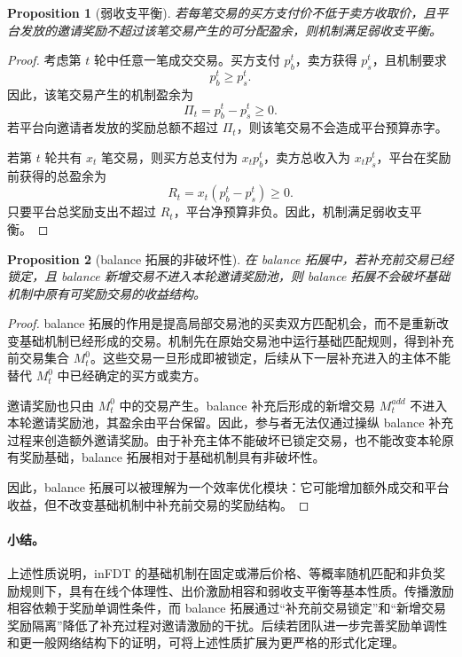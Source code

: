 \documentclass[UTF8,a4paper,12pt]{ctexart}
\newtheorem{proposition}{Proposition}
\begin{document}
\begin{proposition}[弱收支平衡]
    若每笔交易的买方支付价不低于卖方收取价，且平台发放的邀请奖励不超过该笔交易产生的可分配盈余，则机制满足弱收支平衡。
\end{proposition}

\begin{proof}
    考虑第 \(t\) 轮中任意一笔成交交易。买方支付 \(p_b^t\)，卖方获得 \(p_s^t\)，且机制要求
    \[
        p_b^t\ge p_s^t.
    \]
    因此，该笔交易产生的机制盈余为
    \[
        \Pi_t=p_b^t-p_s^t\ge 0.
    \]
    若平台向邀请者发放的奖励总额不超过 \(\Pi_t\)，则该笔交易不会造成平台预算赤字。

    若第 \(t\) 轮共有 \(x_t\) 笔交易，则买方总支付为 \(x_t p_b^t\)，卖方总收入为 \(x_t p_s^t\)，平台在奖励前获得的总盈余为
    \[
        R_t=x_t(p_b^t-p_s^t)\ge 0.
    \]
    只要平台总奖励支出不超过 \(R_t\)，平台净预算非负。因此，机制满足弱收支平衡。
\end{proof}

\begin{proposition}[balance 拓展的非破坏性]
    在 balance 拓展中，若补充前交易已经锁定，且 balance 新增交易不进入本轮邀请奖励池，则 balance 拓展不会破坏基础机制中原有可奖励交易的收益结构。
\end{proposition}

\begin{proof}
    balance 拓展的作用是提高局部交易池的买卖双方匹配机会，而不是重新改变基础机制已经形成的交易。机制先在原始交易池中运行基础匹配规则，得到补充前交易集合 \(M_t^0\)。这些交易一旦形成即被锁定，后续从下一层补充进入的主体不能替代 \(M_t^0\) 中已经确定的买方或卖方。

    邀请奖励也只由 \(M_t^0\) 中的交易产生。balance 补充后形成的新增交易 \(M_t^{add}\) 不进入本轮邀请奖励池，其盈余由平台保留。因此，参与者无法仅通过操纵 balance 补充过程来创造额外邀请奖励。由于补充主体不能破坏已锁定交易，也不能改变本轮原有奖励基础，balance 拓展相对于基础机制具有非破坏性。

    因此，balance 拓展可以被理解为一个效率优化模块：它可能增加额外成交和平台收益，但不改变基础机制中补充前交易的奖励结构。
\end{proof}

\paragraph{小结。}
上述性质说明，inFDT 的基础机制在固定或滞后价格、等概率随机匹配和非负奖励规则下，具有在线个体理性、出价激励相容和弱收支平衡等基本性质。传播激励相容依赖于奖励单调性条件，而 balance 拓展通过“补充前交易锁定”和“新增交易奖励隔离”降低了补充过程对邀请激励的干扰。后续若团队进一步完善奖励单调性和更一般网络结构下的证明，可将上述性质扩展为更严格的形式化定理。
\end{document}
